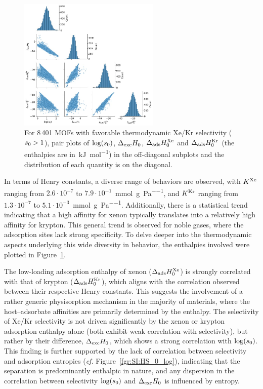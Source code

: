 \documentclass[main.tex]{subfiles}
\begin{document}
\begin{figure}[h]
  \centering
    \includegraphics[width=0.6\textwidth]{figures/2-thermo/Enthalpy_0_log.jpg}
    \caption{For 8\,401 MOFs with favorable thermodynamic Xe/Kr selectivity ($s_{\text{0}} > 1$), pair plots of $\log(s_{\text{0}})$, $\Delta_{\text{exc}}H_{\text{0}}$, $\Delta_{\text{ads}}H^{\text{Xe}}_{\text{0}}$ and $\Delta_{\text{ads}}H^{\text{Kr}}_{\text{0}}$ (the enthalpies are in~\si{\kilo\joule\per\mol}) in the off-diagonal subplots and the distribution of each quantity is on the diagonal.}\label{fgr:histo_H}
  \end{figure}

In terms of Henry constants, a diverse range of behaviors are observed, with $K^{\text{Xe}}$ ranging from $2.6\cdot10^{-7}$ to $7.9\cdot10^{-1}$~\si{\milli\mole\per\gram\per\pascal}, and $K^{\text{Kr}}$ ranging from $1.3\cdot10^{-7}$ to $5.1\cdot10^{-3}$~\si{\milli\mole\per\gram\per\pascal}.  Additionally, there is a statistical trend indicating that a high affinity for xenon typically translates into a relatively high affinity for krypton. This general trend is observed for noble gases, where the adsorption sites lack strong specificity. To delve deeper into the thermodynamic aspects underlying this wide diversity in behavior, the enthalpies involved were plotted in Figure~\ref{fgr:histo_H}.

The low-loading adsorption enthalpy of xenon ($\Delta_{\text{ads}}H^{\text{Xe}}_{\text{0}}$) is strongly correlated with that of krypton ($\Delta_{\text{ads}}H^{\text{Kr}}_{\text{0}}$), which aligns with the correlation observed between their respective Henry constants. This suggests the involvement of a rather generic physisorption mechanism in the majority of materials, where the host--adsorbate affinities are primarily determined by the enthalpy. The selectivity of Xe/Kr selectivity is not driven significantly by the xenon or krypton adsorption enthalpy alone (both exhibit weak correlation with selectivity), but rather by their difference, $\Delta_{\text{exc}}H_{\text{0}}$, which shows a strong correlation with $\log(s_{\text{0}})$. This finding is further supported by the lack of correlation between selectivity and adsorption entropies (\emph{cf.} Figure~\ref{fgr:SI:HS_0_log}), indicating that the separation is predominantly enthalpic in nature, and any dispersion in the correlation between selectivity $\log(s_{\text{0}})$ and $\Delta_{\text{exc}}H_{\text{0}}$ is influenced by entropy.
\end{document}
